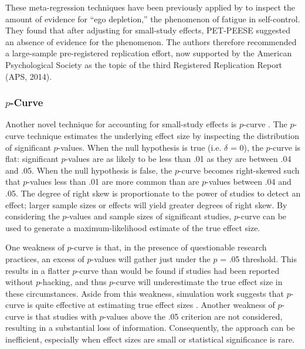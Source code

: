 \documentclass[man, mask]{apa6}
\begin{document}
These meta-regression techniques have been previously applied by \citet{Carter:McCullough:2014} to inspect the amount of evidence for ``ego depletion,'' the phenomenon of fatigue in self-control. They found that after adjusting for small-study effects, PET-PEESE suggested an absence of evidence for the phenomenon. The authors therefore recommended a large-sample pre-registered replication effort, now supported by the American Psychological Society as the topic of the third Registered Replication Report (APS, 2014). \nocite{APS:2014}

\subsubsection{$p$-Curve}
Another novel technique for accounting for small-study effects is $p$-curve \citep{Simonsohn:etal:2014,Simonsohn:etal:2014b}. The $p$-curve technique estimates the underlying effect size by inspecting the distribution of significant $p$-values. 
When the null hypothesis is true (i.e. $\delta$ = 0), the $p$-curve is flat: significant $p$-values are as likely to be less than .01 as they are between .04 and .05. When the null hypothesis is false, the $p$-curve becomes right-skewed such that $p$-values less than .01 are more common than are $p$-values between .04 and .05. The degree of right skew is proportionate to the power of studies to detect an effect; larger sample sizes or effects will yield greater degrees of right skew. By considering the $p$-values and sample sizes of significant studies, $p$-curve can be used to generate a maximum-likelihood estimate of the true effect size.

One weakness of $p$-curve is that, in the presence of questionable research practices, an excess of $p$-values will gather just under the $p$ = .05 threshold. This results in a flatter $p$-curve than would be found if studies had been reported without $p$-hacking, and thus $p$-curve will underestimate the true effect size in these circumstances. Aside from this weakness, simulation work suggests that $p$-curve is quite effective at estimating true effect sizes \citep{Simonsohn:etal:2014,Simonsohn:etal:2014b}.  Another weakness of $p$-curve is that studies with $p$-values above the .05 criterion are not considered, resulting in a substantial loss of information.  Consequently, the approach can be inefficient, especially when effect sizes are small or statistical significance is rare.
\end{document}
